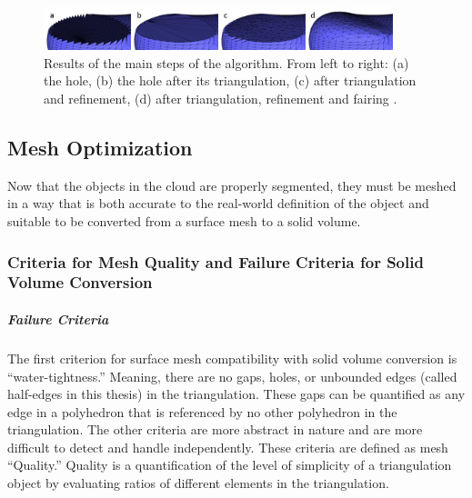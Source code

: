 \documentclass[12pt]{drexelthesis}
\let\Oldsubsection\subsection
\renewcommand{\subsection}{\FloatBarrier\Oldsubsection}
\let\Oldsubsubsection\subsubsection
\renewcommand{\subsubsection}{\FloatBarrier\Oldsubsubsection}
\begin{document}
\begin{figure}[!ht]
	\centering
	\includegraphics[width=4in]{hole_fill.jpg}
	\caption[visualization of hole filling, refinement, and fairing]{Results of the main steps of the algorithm. From left to right: (a) the hole, (b) the hole after its triangulation, (c) after triangulation and refinement, (d) after triangulation, refinement and fairing \cite{meshprocessing}.}
\end{figure}

\subsection{Mesh Optimization}
\label{subsec:meshoptimization}
Now that the objects in the cloud are properly segmented, they must be meshed in a way that is both accurate to the real-world definition of the object and suitable to be converted from a surface mesh to a solid volume.

\subsubsection{Criteria for Mesh Quality and Failure Criteria for Solid Volume Conversion}

\subparagraph{Failure Criteria}
The first criterion for surface mesh compatibility with solid volume conversion is “water-tightness.” Meaning, there are no gaps, holes, or unbounded edges (called half-edges in this thesis) in the triangulation. These gaps can be quantified as any edge in a polyhedron that is referenced by no other polyhedron in the triangulation.
The other criteria are more abstract in nature and are more difficult to detect and handle independently. These criteria are defined as mesh “Quality.” Quality is a quantification of the level of simplicity of a triangulation object by evaluating ratios of different elements in the triangulation.
\end{document}
